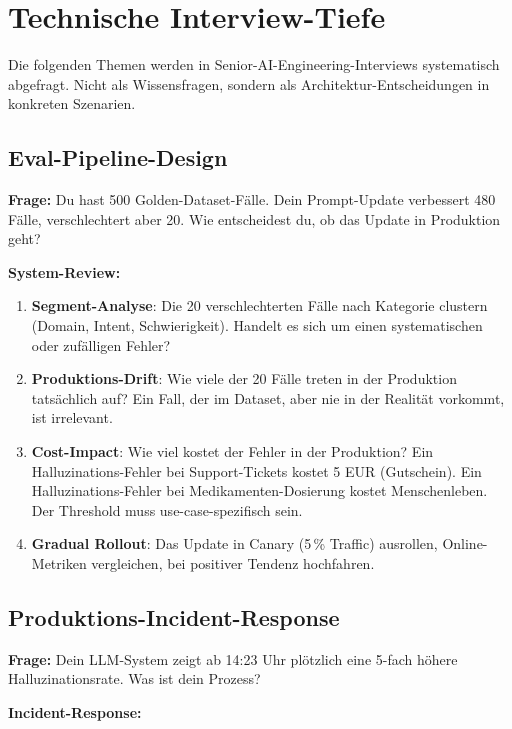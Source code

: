 \section{Technische Interview-Tiefe}

Die folgenden Themen werden in Senior-AI-Engineering-Interviews systematisch abgefragt. Nicht als Wissensfragen, sondern als Architektur-Entscheidungen in konkreten Szenarien.

\subsection{Eval-Pipeline-Design}

\textbf{Frage:} Du hast 500 Golden-Dataset-Fälle. Dein Prompt-Update verbessert 480 Fälle, verschlechtert aber 20. Wie entscheidest du, ob das Update in Produktion geht?

\textbf{System-Review:}

\begin{enumerate}[leftmargin=*]
    \item \textbf{Segment-Analyse}: Die 20 verschlechterten Fälle nach Kategorie clustern (Domain, Intent, Schwierigkeit). Handelt es sich um einen systematischen oder zufälligen Fehler?
    \item \textbf{Produktions-Drift}: Wie viele der 20 Fälle treten in der Produktion tatsächlich auf? Ein Fall, der im Dataset, aber nie in der Realität vorkommt, ist irrelevant.
    \item \textbf{Cost-Impact}: Wie viel kostet der Fehler in der Produktion? Ein Halluzinations-Fehler bei Support-Tickets kostet 5 EUR (Gutschein). Ein Halluzinations-Fehler bei Medikamenten-Dosierung kostet Menschenleben. Der Threshold muss use-case-spezifisch sein.
    \item \textbf{Gradual Rollout}: Das Update in Canary (5\,\% Traffic) ausrollen, Online-Metriken vergleichen, bei positiver Tendenz hochfahren.
\end{enumerate}

\subsection{Produktions-Incident-Response}

\textbf{Frage:} Dein LLM-System zeigt ab 14:23 Uhr plötzlich eine 5-fach höhere Halluzinationsrate. Was ist dein Prozess?

\textbf{Incident-Response:}

